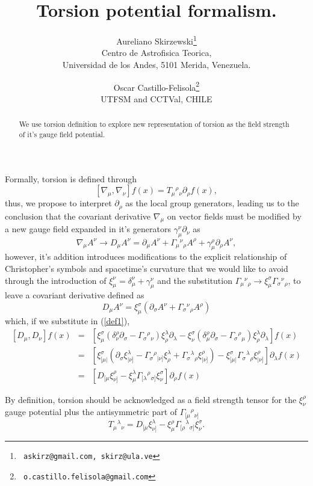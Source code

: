 \documentclass[12pt]{article}
\title{ Torsion potential formalism.}
\author{{\sf Aureliano Skirzewski}\thanks{{\tt
askirz@gmail.com, skirz@ula.ve}}
\\
{\small Centro de Astrofisica Teorica, } \\
{\small Universidad de los Andes, 5101 Merida, Venezuela.} \\ 
\and 
{\sf Oscar Castillo-Felisola}\thanks{{\tt
o.castillo.felisola@gmail.com}}
\\
{\small UTFSM and CCTVal, CHILE} }
\date{}
\def\be{\begin{equation}}
\def\ee{\end{equation}}
\def\ba{\begin{eqnarray}}
\def\ea{\end{eqnarray}}
\def\l{\left}
\def\r{\right}
\begin{document}
\maketitle

\begin{abstract}
We use torsion definition to explore new representation of
torsion as the field strength of it's gauge field potential.
\end{abstract}
Formally, torsion is defined through 
\be 
\label{def1}
\l[\nabla _\mu,\nabla_\nu\r]f(x)=T_\mu{}^\rho{}_\nu
\partial_\rho f(x),
\ee
thus, we propose to interpret $ \partial_\rho $ as the local 
group generators, leading us to the conclusion that the 
covariant derivative  $\nabla_\mu$ on vector fields 
must be modified by a new gauge field 
expanded in it's generators $\gamma_\mu^\nu\partial_\nu$ as 
\be\nabla_\mu A^\nu \to D_\mu A^\nu=\partial_\mu A^\nu+\Gamma_
\mu{}^\nu{}_\rho A^\rho+\gamma_\mu^\rho \partial_\rho A^\nu,\ee
however, it's addition introduces modifications to the explicit 
relationship of Christopher's symbols and spacetime's 
curvature that we would like to avoid through the introduction 
of 
$\xi_\mu^\nu=\delta_\mu^\nu+
\gamma_\mu^\nu $ and the substitution
$\Gamma_\mu{}^\nu{}_\rho\to \xi_\mu^\sigma\Gamma_\sigma{}^\nu
{}_\rho$, to leave a covariant derivative defined as 
\be D_\mu A^\nu=\xi_\mu^\sigma\l(\partial_
\sigma A^\nu+\Gamma_\sigma{}^\nu {}_\rho A^\rho \r)\ee
which, if we substitute in (\ref{def1}),
\ba 
\l[D_\mu,D_\nu\r]f(x)
&=&\l[ \xi_\mu^\sigma\l(\delta_\nu^
\rho\partial_\sigma- \Gamma_\sigma{}^\rho{}_\nu 
\r)\xi_\rho^\lambda\partial_\lambda- \xi_\nu^\sigma\l(\delta_
\mu^\rho\partial_\sigma- \Gamma_\sigma{}^\rho{}_\mu 
\r)\xi_\rho^\lambda\partial_\lambda \r]f(x) \nonumber\\ &=& \l[ 
\xi_{[\mu|}^\sigma\l(\partial_\sigma\xi_{|\nu]}^\lambda-
\Gamma_\sigma{}^\rho{}_{|\nu]}\xi_\rho^\lambda+\Gamma_\sigma{}^
\lambda{}_{\rho}\xi_{|\nu]}^\rho\r) - 
\xi^\sigma_{[\mu|}\Gamma_\sigma{}^\lambda{}_{\rho}\xi_{|\nu]}^
\rho\r]\partial_\lambda f(x) \\ &=& \l[D_{[\mu} \xi_{\nu]}^\rho-
\xi_\mu^\lambda\Gamma_{[\lambda}{}^\rho{}_{\sigma]}\xi_\nu^\sigma 
\r]\partial_\rho f(x)\ea 

By definition, torsion should be acknowledged as a field strength 
tensor for the $\xi_\nu^\rho$ gauge potential plus the 
antisymmetric part of 
$ \Gamma_{[\mu}{}^\rho{}_{\nu]} $
\be\label{torsion} T_\mu {}^\lambda {}_\nu = D_{[\mu}\xi_{\nu]}
^\lambda -\xi_\mu^\rho\Gamma_{[\rho}{} ^\lambda{}_{\sigma]}\xi_\nu
^\sigma.\ee
\end{document}
